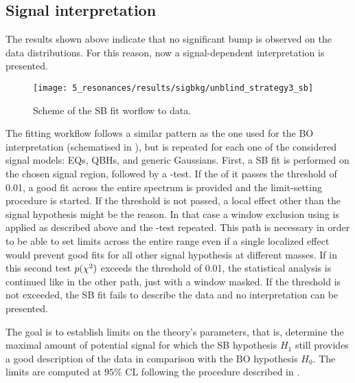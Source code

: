 \subsection{Signal interpretation}
\label{subsec:results:results:bkgsig}

The results shown above indicate that no significant bump is observed on the data distributions. For this reason, now a signal-dependent interpretation is presented.

\begin{figure}[ht!]
    \centering
    \texttt{[image: 5\_resonances/results/sigbkg/unblind\_strategy3\_sb]}
    \caption{Scheme of the \ac{SB} fit worflow to data.}
    \label{fig:results:results:bkgsig:strat}
\end{figure}

The fitting workflow follows a similar pattern as the one used for the \ac{BO} interpretation (schematised in \Fig{\ref{fig:results:results:bkgsig:strat}}), but is repeated for each one of the considered signal models: \acfp{EQ}, \acfp{QBH}, and generic Gaussians.
First, a \ac{SB} fit is performed on the chosen signal region, followed by a \chisq-test. If the \pval of it passes the threshold of 0.01, a good fit across the entire spectrum is provided and the limit-setting procedure is started. If the threshold is not passed, a local effect other than the signal hypothesis might be the reason. In that case a window exclusion using \bh is applied as described above and the \chisq-test repeated. This path is necessary in order to be able to set limits across the entire \myj range even if a single localized effect would prevent good fits for all other signal hypothesis at different masses. If in this second test \(p(\chi^{2})\) exceeds the threshold of 0.01, the statistical analysis is continued like in the other path, just with a window masked. If the threshold is not exceeded, the \ac{SB} fit fails to describe the data and no interpretation can be presented.

The goal is to establish limits on the theory's parameters, that is, determine the maximal amount of potential signal for which the \ac{SB} hypothesis \(H_1\) still provides a good description of the data in comparison with the \ac{BO} hypothesis \(H_0\). The limits are computed at \(95\%\) \ac{CL} following the procedure described in \Sect{\ref{subsec:strategy:stat_treatment:hypo_test}}. 


